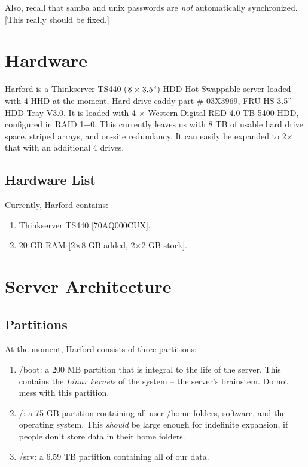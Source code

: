 \documentclass[final,titlepage,letterpaper,oneside,12pt]{article}
\renewcommand{\texttt}[2][BrickRed]{\textcolor{#1}{\ttfamily #2}}%
\begin{document}
Also, recall that samba and unix passwords are \textit{not} automatically synchronized. [This really should be fixed.]

\section{Hardware}

Harford is a \texttt{Thinkserver TS440 ($8 \times 3.5"$) HDD Hot-Swappable} server loaded with 4 HHD at the moment. Hard drive caddy part \texttt{\# 03X3969, FRU HS 3.5” HDD Tray V3.0}. It is loaded with 4 $\times$ Western Digital RED 4.0 TB 5400 HDD, configured in RAID 1+0. This currently leaves us with 8 TB of usable hard drive space, striped arrays, and on-site redundancy. It can easily be expanded to 2$\times$ that with an additional 4 drives.

\subsection{Hardware List}

Currently, Harford contains:

\begin{enumerate} \itemsep-2pt
    \item{Thinkserver TS440 [70AQ000CUX].}
    \item{20 GB RAM [2$\times$8 GB added, 2$\times$2 GB stock].}
\end{enumerate}


\section{Server Architecture}
\subsection{Partitions}

At the moment, Harford consists of three partitions: 

\begin{enumerate}
    \item{\texttt{/boot}: a 200 MB partition that is integral to the life of the server. This contains the \textit{Linux kernels} of the system -- the server's brainstem. Do not mess with this partition.}
    
    \item{\texttt{/}: a 75 GB partition containing all user \texttt{/home} folders, software, and the operating system. This \textit{should} be large enough for indefinite expansion, if people don't store data in their home folders.}
    
    \item{\texttt{/srv}: a 6.59 TB partition containing all of our data.}
\end{enumerate}
\end{document}
